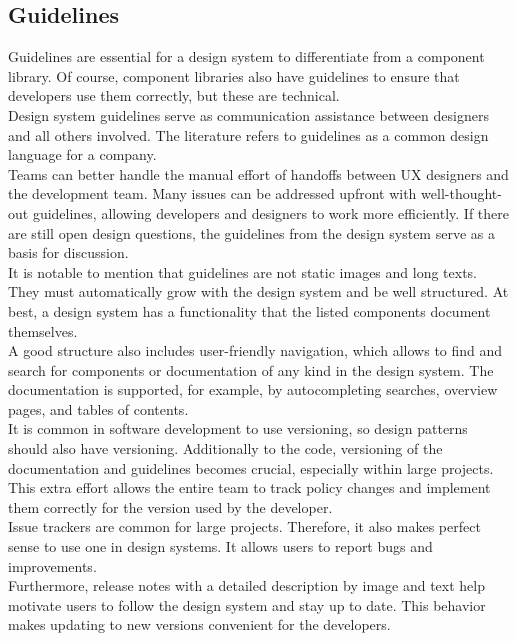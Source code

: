 \subsection{Guidelines}
Guidelines are essential for a design system to differentiate from a component library. Of course, component libraries also have guidelines to ensure that developers use them correctly, but these are technical.  \\
Design system guidelines serve as communication assistance between designers and all others involved. The literature refers to guidelines as a common design language for a company. \\
Teams can better handle the manual effort of handoffs between \ac{UX} designers and the development team. Many issues can be addressed upfront with well-thought-out guidelines, allowing developers and designers to work more efficiently. If there are still open design questions, the guidelines from the design system serve as a basis for discussion. \cite{vesselov_building_2019} \\
It is notable to mention that guidelines are not static images and long texts. They must automatically grow with the design system and be well structured. At best, a design system has a functionality that the listed components document themselves. \\
A good structure also includes user-friendly navigation, which allows to find and search for components or documentation of any kind in the design system. The documentation is supported, for example, by autocompleting searches, overview pages, and tables of contents.  \cite{macdonald_practical_2019}\cite{vesselov_building_2019} \\
It is common in software development to use versioning, so design patterns should also have versioning. Additionally to the code, versioning of the documentation and guidelines becomes crucial, especially within large projects. This extra effort allows the entire team to track policy changes and implement them correctly for the version used by the developer. \\
Issue trackers are common for large projects. Therefore, it also makes perfect sense to use one in design systems. It allows users to report bugs and improvements. \\
Furthermore, release notes with a detailed description by image and text help motivate users to follow the design system and stay up to date. This behavior makes updating to new versions convenient for the developers. \cite{macdonald_practical_2019} \\

